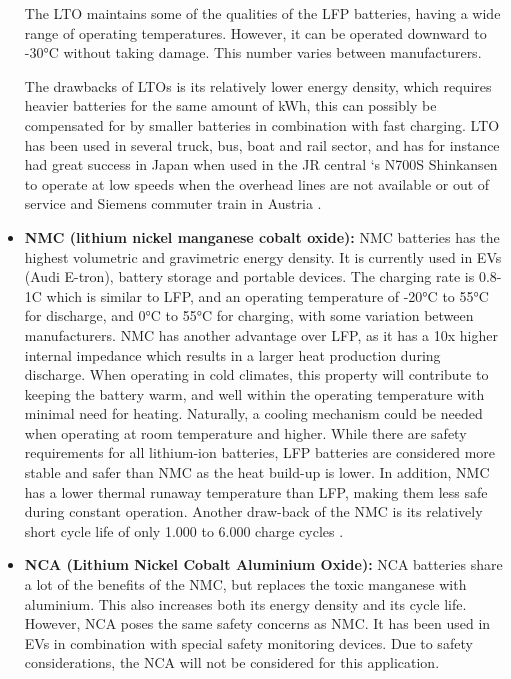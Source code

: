 \documentclass{article}
\begin{document}
\begin{itemize}
The LTO maintains some of the qualities of the LFP batteries, having a wide range of operating temperatures. However, it can be operated downward to -30°C without taking damage. This number varies between manufacturers.

The drawbacks of LTOs is its relatively lower energy density, which requires heavier batteries for the same amount of kWh, this can possibly be compensated for by smaller batteries in combination with fast charging. LTO has been used in several truck, bus, boat and rail sector, and has for instance had great success in Japan when used in the JR central ‘s N700S Shinkansen to operate at low speeds when the overhead lines are not available or out of service and Siemens commuter train in Austria \cite{scib} \cite{mwabeleko}.


\item \textbf{NMC (lithium nickel manganese cobalt oxide):} NMC batteries has the highest volumetric and gravimetric energy density. It is currently used in EVs (Audi E-tron), battery storage and portable devices. The charging rate is 0.8-1C which is similar to LFP, and an operating temperature of -20°C to 55°C for discharge, and 0°C to 55°C for charging, with some variation between manufacturers. NMC has another advantage over LFP, as it has a 10x higher internal impedance which results in a larger heat production during discharge. When operating in cold climates, this property will contribute to keeping the battery warm, and well within the operating temperature with minimal need for heating. Naturally, a cooling mechanism could be needed when operating at room temperature and higher. While there are safety requirements for all lithium-ion batteries, LFP batteries are considered more stable and safer than NMC as the heat build-up is lower. In addition, NMC has a lower thermal runaway temperature than LFP, making them less safe during constant operation. Another draw-back of the NMC is its relatively short cycle life of only 1.000 to 6.000 charge cycles \cite{wevj6030572} \cite{batteries7030051}.


\item \textbf{NCA (Lithium Nickel Cobalt Aluminium Oxide):} NCA batteries share a lot of the benefits of the NMC, but replaces the toxic manganese with aluminium. This also increases both its energy density and its cycle life. However, NCA poses the same safety concerns as NMC. It has been used in EVs in combination with special safety monitoring devices. Due to safety considerations, the NCA will not be considered for this application.

\end{itemize}
\end{document}
